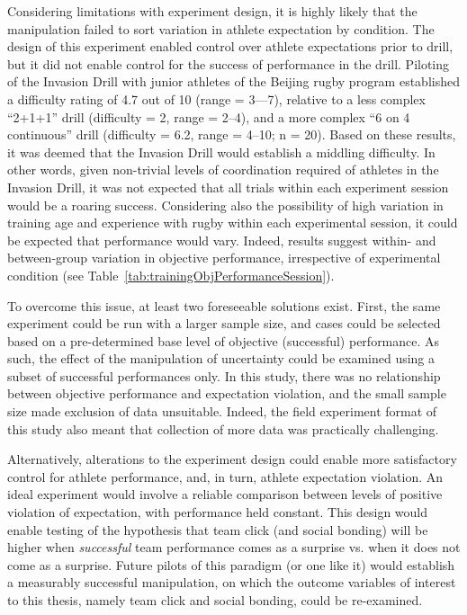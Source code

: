\begin{CJK}{UTF8}{gbsn}
Considering limitations with experiment design, it is highly likely that the manipulation failed to sort variation in athlete expectation by condition.  The design of this experiment enabled control over athlete expectations prior to drill, but it did not enable control for the success of performance in the drill.  Piloting of the Invasion Drill with junior athletes of the Beijing rugby program established a difficulty rating of 4.7 out of 10 (range = 3—7), relative to a less complex ``2+1+1'' drill (difficulty = 2, range = 2–4), and a more complex ``6 on 4 continuous'' drill (difficulty = 6.2, range = 4–10; n = 20).  Based on these results, it was deemed that the Invasion Drill would establish a middling difficulty.  In other words, given non-trivial levels of coordination required of athletes in the Invasion Drill, it was not expected that all trials within each experiment session would be a roaring success.  Considering also the possibility of high variation in training age and experience with rugby within each experimental session, it could be expected that performance would vary.  Indeed, results suggest within- and between-group variation in objective performance, irrespective of experimental condition (see Table~\ref{tab:trainingObjPerformanceSession}).

To overcome this issue, at least two foreseeable solutions exist.  First, the same experiment could be run with a larger sample size, and cases could be selected based on a pre-determined base level of objective (successful) performance.  As such, the effect of the manipulation of uncertainty could be examined using a subset of successful performances only.  In this study, there was no relationship between objective performance and expectation violation, and the small sample size made exclusion of data unsuitable.  Indeed, the field experiment format of this study also meant that collection of more data was practically challenging.

Alternatively, alterations to the experiment design could enable more satisfactory control for athlete performance, and, in turn, athlete expectation violation.  An ideal experiment would involve a reliable comparison between levels of positive violation of expectation, with performance held constant.  This design would enable testing of the hypothesis that team click (and social bonding) will be higher when \textit{successful} team performance comes as a surprise vs. when it does not come as a surprise.  Future pilots of this paradigm (or one like it) would establish a measurably successful manipulation, on which the outcome variables of interest to this thesis, namely team click and social bonding, could be re-examined.


\end{CJK}
